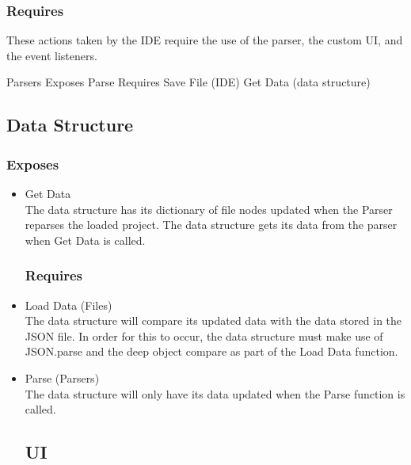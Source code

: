\documentclass[letterpaper,10pt,titlepage,draftclsnofoot,onecolumn,onesided] {IEEEtran}
\begin{document}
		\subsubsection{Requires}
			These actions taken by the IDE require the use of the parser, the custom UI, and the event listeners.
	
	Parsers
		Exposes
			Parse 
		Requires
			Save File (IDE)
			Get Data (data structure)
	
\subsection{Data Structure}
		\subsubsection{Exposes}
		\begin{itemize}
			\item Get Data
			\\
			The data structure has its dictionary of file nodes updated when the Parser reparses the loaded project. 
			The data structure gets its data from the parser when Get Data is called.
		\subsubsection{Requires}
			\item Load Data (Files)
			\\
			The data structure will compare its updated data with the data stored in the JSON file. 
			In order for this to occur, the data structure must make use of JSON.parse and the deep object compare as part of the Load Data function.
			\item Parse (Parsers)
			\\
			The data structure will only have its data updated when the Parse function is called.
\subsection{UI}

\end{itemize}
\end{document}

